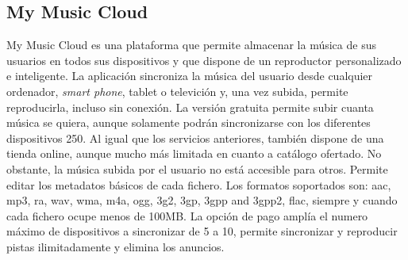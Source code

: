 \subsection{My Music Cloud \cite{MMC}}
My Music Cloud es una plataforma que permite almacenar la música de sus usuarios en todos sus dispositivos y que dispone de un reproductor personalizado e inteligente. La aplicación sincroniza la música del usuario desde cualquier ordenador, \textit{smart phone}, tablet o televición y, una vez subida, permite reproducirla, incluso sin conexión. La versión gratuita permite subir cuanta música se quiera, aunque solamente podrán sincronizarse con los diferentes dispositivos 250. Al igual que los servicios anteriores, también dispone de una tienda online, aunque mucho más limitada en cuanto a catálogo ofertado. No obstante, la música subida por el usuario no está accesible para otros. Permite editar los metadatos básicos de cada fichero. Los formatos soportados son: aac, mp3, ra, wav, wma, m4a, ogg, 3g2, 3gp, 3gpp and 3gpp2, flac, siempre y cuando cada fichero ocupe menos de 100MB. La opción de pago amplía el numero máximo de dispositivos a sincronizar de 5 a 10, permite sincronizar y reproducir pistas ilimitadamente y elimina los anuncios.